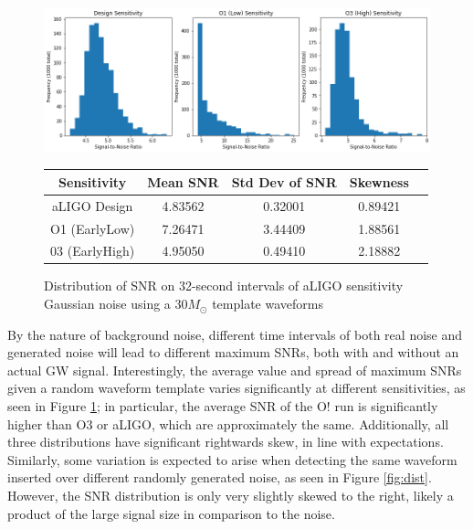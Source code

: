 \documentclass{article}
\begin{document}
\begin{figure}[!htb]
    \begin{center}
        \includegraphics[width=\textwidth]{SNR4.png}
        
        \vspace{5mm}
        
        \begin{tabular}{| c | c | c | c | c | }
            \hline
            Sensitivity & Mean SNR & Std Dev of SNR & Skewness \\
            \hline
            aLIGO Design & 4.83562 & 0.32001 & 0.89421 \\
            O1 (EarlyLow) & 7.26471 & 3.44409 & 1.88561 \\
            03 (EarlyHigh) & 4.95050 & 0.49410 & 2.18882 \\
            \hline
        \end{tabular}
    \end{center}
    
    \caption{\label{fig:noise} Distribution of SNR on 32-second intervals of aLIGO sensitivity Gaussian noise using a $30 M_\odot$ template waveforms}
\end{figure}

By the nature of background noise, different time intervals of both real noise and generated noise will lead to different maximum SNRs, both with and without an actual GW signal. Interestingly, the average value and spread of maximum SNRs given a random waveform template varies significantly at different sensitivities, as seen in Figure \ref{fig:noise}; in particular, the average SNR of the O! run is significantly higher than O3 or aLIGO, which are approximately the same. Additionally, all three distributions have significant rightwards skew, in line with expectations. \\

Similarly, some variation is expected to arise when detecting the same waveform inserted over different randomly generated noise, as seen in Figure \ref{fig:dist}. However, the SNR distribution is only very slightly skewed to the right, likely a product of the large signal size in comparison to the noise.
\end{document}
